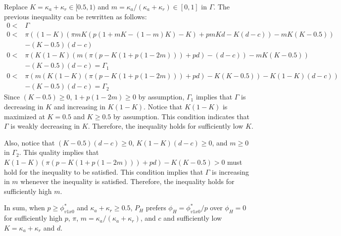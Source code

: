 \par Replace $K = \kappa_a + \kappa_r \in [0.5,1)$ and $m = \kappa_a/(\kappa_a+\kappa_r) \in [0,1]$ in $\Gamma$. The previous inequality can be rewritten as follows:
\begin{align*}
0 <& \Gamma  \\
0 <& \pi ( (1-K)(\pi mK(p(1+mK-(1-m)K)-K)+pmKd-K(d-c)) - mK(K-0.5) ) \\ &- (K-0.5)(d-c) \\
0 <&\pi( K(1-K)(m(\pi(p-K(1+p(1-2m))) + pd) - (d-c)) - mK(K-0.5)) \\ &- (K-0.5)(d-c) = \Gamma_{1}\\
0 <&\pi( m(K(1-K)(\pi(p-K(1+p(1-2m))) + pd) - K(K-0.5)) - K(1-K)(d-c) ) \\ &- (K-0.5)(d-c) = \Gamma_{2}
\end{align*}
\noindent Since $(K-0.5)\geq0$, $1+p(1-2m)\geq 0$ by assumption, $\Gamma_{1}$ implies that $\Gamma$ is decreasing in $K$ and increasing in $K(1-K)$. Notice that $K(1-K)$ is maximized at $K=0.5$ and $K\geq0.5$ by assumption. This condition indicates that $\Gamma$ is weakly decreasing in $K$. Therefore, the inequality holds for sufficiently low $K$. 

\par Also, notice that $(K-0.5)(d-c)\geq0$, $K(1-K)(d-c)\geq 0$, and $m\geq0$ in $\Gamma_2$. This quality implies that $K(1-K)(\pi(p-K(1+p(1-2m))) + pd) - K(K-0.5)>0$ must hold for the inequality to be satisfied. This condition implies that $\Gamma$ is increasing in $m$ whenever the inequality is satisfied. Therefore, the inequality holds for sufficiently high $m$.

\par In sum, when $p \geq \phi^*_{v1x0}$ and $\kappa_a+\kappa_r \geq 0.5$, $P_H$ prefers $\phi_H=\phi^*_{v1x0}/p$ over $\phi_H=0$ for sufficiently high $p$, $\pi$, $m = \kappa_a/(\kappa_a+\kappa_r)$, and $c$ and sufficiently low $K = \kappa_a + \kappa_r$ and $d$. 

